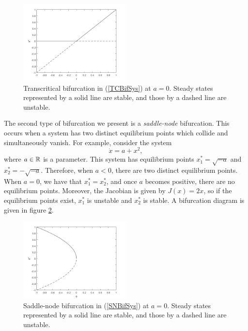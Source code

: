 \documentclass[12pt]{UOthesis}
\theoremstyle{remarkstyle}
\begin{document}
\begin{figure}[h!]
	\centering
	\includegraphics[width=0.5\textwidth]{BifTC.png}
	\caption[Trans-critical bifurcation]{Transcritical bifurcation in (\ref{TCBifSys}) at $a=0$. Steady states represented by a solid line are stable, and those by a dashed line are unstable.\label{BifTC}}
\end{figure}

The second type of bifurcation we present is a \textit{saddle-node} bifurcation. This occurs when a system has two distinct equilibrium points which collide and simultaneously vanish. For example, consider the system
\begin{equation}
	\dot{x}=a+x^2,
	\label{SNBifSys}
\end{equation}
where $a\in\mathbb R$ is a parameter. This system has equilibrium points $x^*_1=\sqrt{-a}$ and $x^*_2=-\sqrt{-a}$. Therefore, when $a<0$, there are two distinct equilibrium points. When $a=0$, we have that $x^*_1=x^*_2$, and once $a$ becomes positive, there are no equilibrium points. Moreover, the Jacobian is given by $J(x)=2x$, so if the equilibrium points exist, $x^*_1$ is unstable and $x^*_2$ is stable. A bifurcation diagram is given in figure \ref{BifSN}.\\

\begin{figure}[h!]
	\centering
	\includegraphics[width=0.5\textwidth]{BifSN.png}
	\caption[Saddle-node bifurcation]{Saddle-node bifurcation in (\ref{SNBifSys}) at $a=0$. Steady states represented by a solid line are stable, and those by a dashed line are unstable.\label{BifSN}}
\end{figure}
\end{document}
